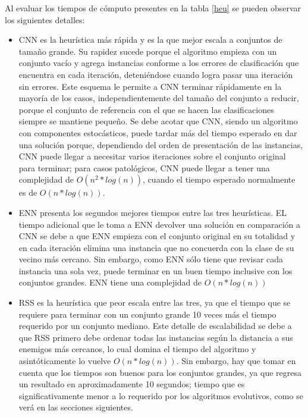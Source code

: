 Al evaluar los tiempos de cómputo presentes en la tabla \ref{heu} se pueden observar los siguientes detalles:

\begin{itemize}

\item CNN es la heurística más rápida y es la que mejor escala a conjuntos de tamaño grande. Su rapidez sucede porque el algoritmo empieza con un conjunto vacío y agrega instancias conforme a los errores de clasificación que encuentra en cada iteración, deteniéndose cuando logra pasar una iteración sin errores. Este esquema le permite a CNN terminar rápidamente en la mayoría de los casos, independientemente del tamaño del conjunto a reducir, porque el conjunto de referencia con el que se hacen las clasificaciones siempre se mantiene pequeño. Se debe acotar que CNN, siendo un algoritmo con componentes estocásticos, puede tardar más del tiempo esperado en dar una solución porque, dependiendo del orden de presentación de las instancias, CNN puede llegar a necesitar varios iteraciones sobre el conjunto original para terminar; para casos patológicos, CNN puede llegar a tener una complejidad de $O(n^2*log(n))$, cuando el tiempo esperado normalmente es de $O(n*log(n))$.

\item ENN presenta los segundos mejores tiempos entre las tres heurísticas. EL tiempo adicional que le toma a ENN devolver una solución en comparación a CNN se debe a que ENN empieza con el conjunto original en su totalidad y en cada iteración elimina una instancia que no concuerda con la clase de su vecino más cercano. Sin embargo, como ENN sólo tiene que revisar cada instancia una sola vez, puede terminar en un buen tiempo inclusive con los conjuntos grandes. ENN tiene una complejidad de $O(n*log(n))$  

\item RSS es la heurística que peor escala entre las tres, ya que el tiempo que se requiere para terminar con un conjunto grande 10 veces más el tiempo requerido por un conjunto mediano. Este detalle de escalabilidad se debe a que RSS primero debe ordenar todas las instancias según la distancia a sus enemigos más cercanos, lo cual domina el tiempo del algoritmo y asintóticamente lo vuelve $O(n*log(n))$. Sin embargo, hay que tomar en cuenta que los tiempos son buenos para los conjuntos grandes, ya que regresa un resultado en aproximadamente 10 segundos; tiempo que es significativamente menor a lo requerido por los algoritmos evolutivos, como se verá en las secciones siguientes.

\end{itemize}

